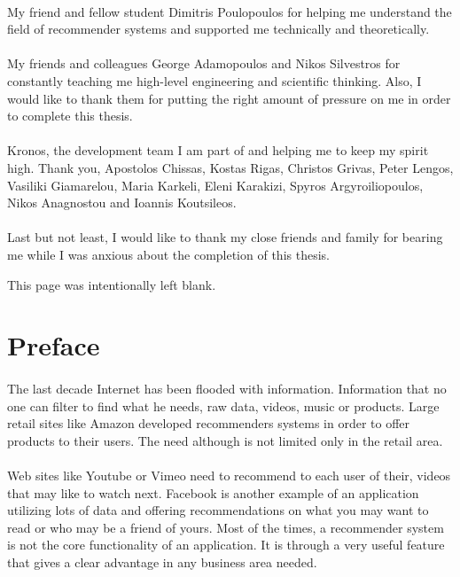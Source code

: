 \documentclass[10pt, a4paper, oneside]{journal}
\begin{document}
	\paragraph{} My friend and fellow student Dimitris Poulopoulos for helping me understand the field of recommender systems and supported me technically and theoretically.
	
	\paragraph{} My friends and colleagues George Adamopoulos and Nikos Silvestros for constantly teaching me high-level engineering and scientific thinking. Also, I would like to thank them for putting the right amount of pressure on me in order to complete this thesis.
	
	\paragraph{} Kronos, the development team I am part of and helping me to keep my spirit high. Thank you, Apostolos Chissas, Kostas Rigas, Christos Grivas, Peter Lengos, Vasiliki Giamarelou, Maria Karkeli, Eleni Karakizi, Spyros Argyroiliopoulos, Nikos Anagnostou and Ioannis Koutsileos. 
	
	\paragraph{} Last but not least, I would like to thank my close friends and family for bearing me while I was anxious about the completion of this thesis.
	
	\newpage
	\begin{center}
		This page was intentionally left blank.
	\end{center}
	\newpage
	\section{Preface}
	\paragraph{} The last decade Internet has been flooded with information. Information that no one can filter to find what he needs, raw data, videos, music or products. Large retail sites like Amazon developed recommenders systems in order to offer products to their users. The need although is not limited only in the retail area. 
	\paragraph{}Web sites like Youtube or Vimeo need to recommend to each user of their, videos that may like to watch next. Facebook is another example of an application utilizing lots of data and offering recommendations on what you may want to read or who may be a friend of yours. Most of the times, a recommender system is not the core functionality of an application. It is through a very useful feature that gives a clear advantage in any business area needed.
	
\end{document}
